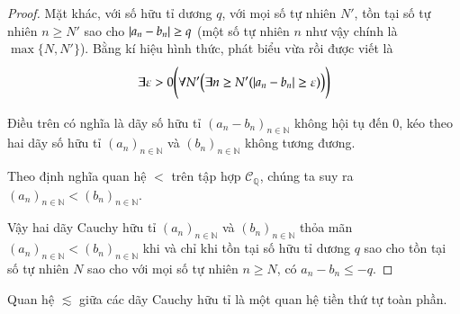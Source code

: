 \begin{proof}
    Mặt khác, với số hữu tỉ dương $q$, với mọi số tự nhiên $N'$, tồn tại số tự nhiên $n\geq N'$ sao cho $\left\vert{a_{n} - b_{n}}\right\vert\geq q$ (một số tự nhiên $n$ như vậy chính là $\max\{ N, N' \}$). Bằng kí hiệu hình thức, phát biểu vừa rồi được viết là
    \[
        \exists \varepsilon > 0\Biggl( \forall N' \bigl( \exists n\geq N'( \left\vert{a_{n} - b_{n}}\right\vert \geq \varepsilon ) \bigr) \Biggr)
    \]

    Điều trên có nghĩa là dãy số hữu tỉ ${(a_{n} - b_{n})}_{n\in\mathbb{N}}$ không hội tụ đến $0$, kéo theo hai dãy số hữu tỉ ${(a_{n})}_{n\in\mathbb{N}}$ và ${(b_{n})}_{n\in\mathbb{N}}$ không tương đương.

    Theo định nghĩa quan hệ $<$ trên tập hợp $\mathscr{C}_{\mathbb{Q}}$, chúng ta suy ra ${(a_{n})}_{n\in\mathbb{N}} < {(b_{n})}_{n\in\mathbb{N}}$.

    \bigskip

    Vậy hai dãy Cauchy hữu tỉ ${(a_{n})}_{n\in\mathbb{N}}$ và ${(b_{n})}_{n\in\mathbb{N}}$ thỏa mãn ${(a_{n})}_{n\in\mathbb{N}} < {(b_{n})}_{n\in\mathbb{N}}$ khi và chỉ khi tồn tại số hữu tỉ dương $q$ sao cho tồn tại số tự nhiên $N$ sao cho với mọi số tự nhiên $n\geq N$, có $a_{n} - b_{n}\leq -q$.
\end{proof}

\begin{appendixthm}
    Quan hệ $\lesssim$ giữa các dãy Cauchy hữu tỉ là một quan hệ tiền thứ tự toàn phần.
\end{appendixthm}

